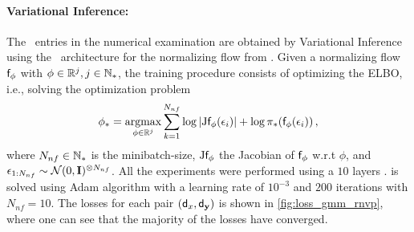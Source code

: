 \paragraph{Variational Inference:}
The \rnvp\ entries in the numerical examination are obtained by Variational Inference using the \rnvp\ architecture for the normalizing flow from \cite{Dinh:2017}.
Given a normalizing flow $\mathsf{f}_{\phi}$ with $\phi \in \mathbb{R}^{j}, j \in \mathbb{N}_*$, the training procedure consists of optimizing the ELBO, i.e., solving the optimization problem
\begin{equation}
    \label{eq:nf_optim}
    \phi_{*} = \operatorname*{argmax}_{\phi \in \mathbb{R}^j} \sum_{k=1}^{N_{nf}}\log|\mathrm{J}\mathsf{f}_{\phi}(\epsilon_i)| + \log\pi_*(\mathsf{f}_{\phi}(\epsilon_i)) \,,
\end{equation}
where $N_{nf} \in \mathbb{N}_*$ is the minibatch-size, $\mathrm{J}\mathsf{f}_{\phi}$ the Jacobian of $\mathsf{f}_{\phi}$ w.r.t $\phi$, and $\epsilon_{1:N_{nf}} \sim \mathcal{N}(0, \mathbf{I})^{\otimes N_{nf}}$.
All the experiments were performed using a $10$ layers \rnvp.  is solved using Adam algorithm \cite{Kingma:2015} with a learning rate of $10^{-3}$
and $200$ iterations with $N_{nf} = 10$.
The losses for each pair $({\mathsf{d}_x}, {\mathsf{d}_{\mathbf{y}}})$ is shown in \cref{fig:loss_gmm_rnvp}, where one can see that the majority of the losses have converged.
